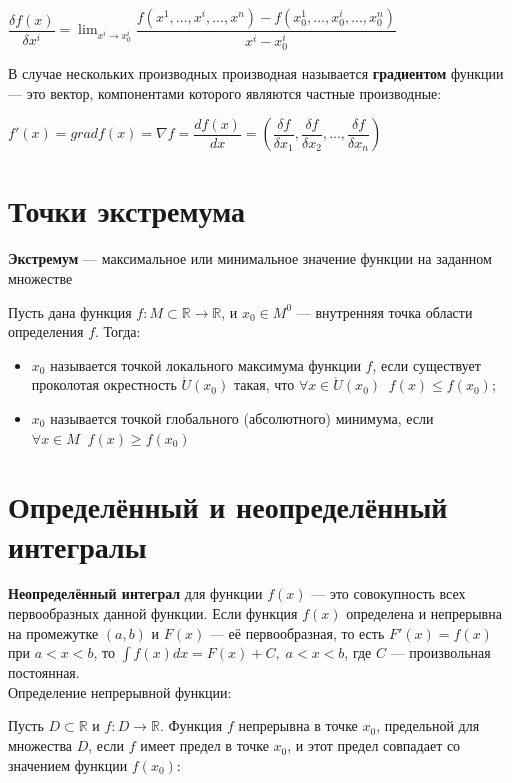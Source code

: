 \documentclass[a4paper,14pt,fleqn]{article}
\begin{document}
$\dfrac{\delta f(x)}{\delta x^i}=\lim_{x^i\to x_{0}^i}\dfrac{f(x^1,...,x^i,...,x^n)-f(x_{0}^1,...,x_{0}^i,...,x_{0}^n)}{x^i-x_{0}^i}$

В случае нескольких производных производная называется \textbf{градиентом} функции --- это вектор, компонентами которого являются частные производные:

$f'(x)=grad f(x)=\nabla f=\dfrac{df(x)}{dx}=(\dfrac{\delta f}{\delta x_1},\dfrac{\delta f}{\delta x_2},...,\dfrac{\delta f}{\delta x_n})$

\section{Точки экстремума}

\textbf{Экстремум} --- максимальное или минимальное значение функции на заданном множестве

\noindent Пусть дана функция $f:M\subset\mathbb{R}\to\mathbb{R}$, и $x_0\in M^0$ --- внутренняя точка области определения $f$. Тогда:

\begin{itemize}
    \item $x_0$ называется точкой локального максимума функции $f$, если существует проколотая окрестность $\mathring{U}(x_0)$ такая, что $\forall x\in\mathring{U}(x_0)\;\; f(x)\leq f(x_0)$;

    \item $x_0$ называется точкой глобального (абсолютного) минимума, если $\forall x\in M\;\; f(x)\geq f(x_0)$

\end{itemize}

\section{Определённый и неопределённый интегралы}

\textbf{Неопределённый интеграл} для функции $f(x)$ --- это совокупность всех первообразных данной функции. Если функция $f(x)$ определена и непрерывна на промежутке $(a, b)$ и $F(x)$ --- её первообразная, то есть $F'(x)=f(x)$ при $a<x<b$, то $\int f(x)dx=F(x)+C, \;a<x<b$, где $C$ --- произвольная постоянная.\\

\noindent* Определение непрерывной функции:

Пусть $D\subset \mathbb{R}$ и $f:D\to\mathbb{R}$. Функция $f$ непрерывна в точке $x_0$, предельной для множества $D$, если $f$ имеет предел в точке $x_0$, и этот предел совпадает со значением функции $f(x_0)$:
\end{document}
